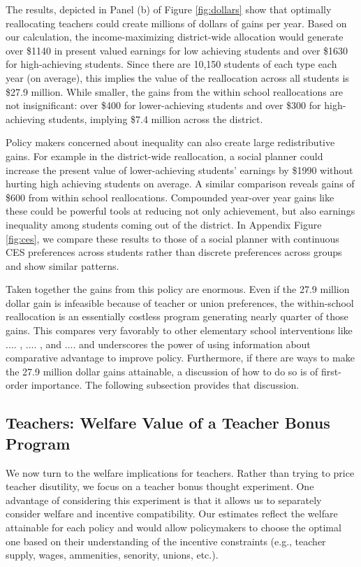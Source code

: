 \documentclass[12pt]{article}
\theoremstyle{definition}
\theoremstyle{definition}
\theoremstyle{definition}
\theoremstyle{definition}
\begin{document}
The results, depicted in Panel (b) of Figure \ref{fig:dollars} show that optimally reallocating teachers could create millions of dollars of gains per year. Based on our calculation, the income-maximizing district-wide allocation would generate over \$1140 in present valued earnings for low achieving students and over \$1630 for high-achieving students. Since there are 10,150 students of each type each year (on average), this implies the value of the reallocation across all students is  \$27.9 million. While smaller, the gains from the within school reallocations are not insignificant: over \$400 for lower-achieving students and over \$300 for high-achieving students, implying \$7.4 million across the district.

Policy makers concerned about inequality can also create large redistributive gains. For example in the district-wide reallocation, a social planner could increase the present value of lower-achieving students' earnings by \$1990 without hurting high achieving students on average. A similar comparison reveals gains of \$600 from within school reallocations. Compounded year-over year gains like these could be powerful tools at reducing not only achievement, but also earnings inequality among students coming out of the district. In Appendix Figure \ref{fig:ces}, we compare these results to those of a social planner with continuous CES preferences across students rather than discrete preferences across groups and show similar patterns.  

Taken together the gains from this policy are enormous. Even if the 27.9 million dollar gain is infeasible because of teacher or union preferences, the within-school reallocation is an essentially costless program generating nearly quarter of those gains. This compares very favorably to other elementary school interventions like .... \citep[][]{}, .... \citep[][]{}, and .... \citep[][]{} and underscores the power of using information about comparative advantage to improve policy. Furthermore, if there are ways to make the 27.9 million dollar gains attainable, a discussion of how to do so is of first-order importance. The following subsection provides that discussion.

\subsection{Teachers: Welfare Value of a Teacher Bonus Program}

We now turn to the welfare implications for teachers. Rather than trying to price teacher disutility, we focus on a teacher bonus thought experiment. One advantage of considering this experiment is that it allows us to separately consider welfare and incentive compatibility. Our estimates reflect the welfare attainable for each policy and would allow policymakers to choose the optimal one based on their understanding of the incentive constraints (e.g., teacher supply, wages, ammenities, senority, unions, etc.).
\end{document}
